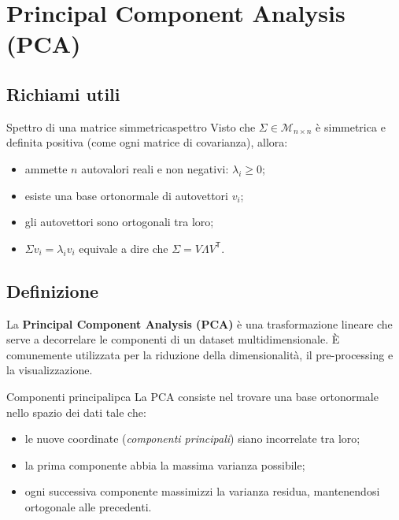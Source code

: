 \section{Principal Component Analysis (PCA)}\label{sec:pca}

\subsection{Richiami utili}

\begin{nota}{Spettro di una matrice simmetrica}{spettro}
Visto che \( \Sigma \in \mathcal{M}_{n \times n}\) è simmetrica e definita
positiva (come ogni matrice di covarianza), allora:
\begin{itemize}
  \item ammette $n$ autovalori reali e non negativi: \( \lambda_i \geq 0 \);
  \item esiste una base ortonormale di autovettori \( v_i \);
  \item gli autovettori sono ortogonali tra loro;
  \item \( \Sigma v_i = \lambda_i v_i \) equivale a dire che \( \Sigma = V
  \Lambda V^\mathsf{T} \).
\end{itemize}
\end{nota}

\subsection{Definizione}

La \textbf{Principal Component Analysis (PCA)} è una trasformazione lineare che
serve a decorrelare le componenti di un dataset multidimensionale. È
comunemente utilizzata per la riduzione della dimensionalità, il pre-processing
e la visualizzazione.

\begin{definizione}{Componenti principali}{pca}
La PCA consiste nel trovare una base ortonormale nello spazio dei dati tale che:
\begin{itemize}
  \item le nuove coordinate (\emph{componenti principali}) siano incorrelate tra
  loro;
  \item la prima componente abbia la massima varianza possibile;
  \item ogni successiva componente massimizzi la varianza residua, mantenendosi
  ortogonale alle precedenti.
\end{itemize}
\end{definizione}

